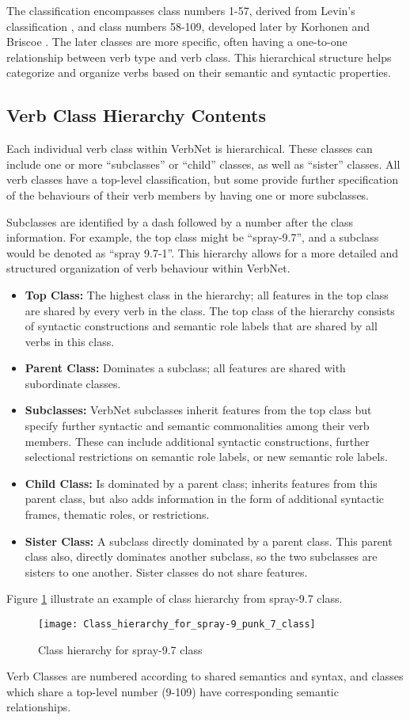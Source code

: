 The classification encompasses class numbers 1-57, derived from Levin's classification \cite{levin1993english}, and class numbers 58-109, developed later by Korhonen and Briscoe \cite{korhonen2004extended}. The later classes are more specific, often having a one-to-one relationship between verb type and verb class. This hierarchical structure helps categorize and organize verbs based on their semantic and syntactic properties.
\subsection*{Verb Class Hierarchy Contents}
Each individual verb class within VerbNet is hierarchical. These classes can include one or more \enquote{subclasses} or \enquote{child} classes, as well as \enquote{sister} classes. All verb classes have a top-level classification, but some provide further specification of the behaviours of their verb members by having one or more subclasses. 

Subclasses are identified by a dash followed by a number after the class information. For example, the top class might be \enquote{spray-9.7}, and a subclass would be denoted as \enquote{spray 9.7-1}. This hierarchy allows for a more detailed and structured organization of verb behaviour within VerbNet. 
\begin{itemize}
\item \textbf{Top Class:} The highest class in the hierarchy; all features in the top class are shared by every verb in the class. The top class of the hierarchy consists of syntactic constructions and semantic role labels that are shared by all verbs in this class.
\item \textbf{Parent Class:} Dominates a subclass; all features are shared with subordinate classes.
\item \textbf{Subclasses:} VerbNet subclasses inherit features from the top class but specify further syntactic and semantic commonalities among their verb members. These can include additional syntactic constructions, further selectional restrictions on semantic role labels, or new semantic role labels.
\item \textbf{Child Class:} Is dominated by a parent class; inherits features from this parent class, but also adds information in the form of additional syntactic frames, thematic roles, or restrictions. 
\item \textbf{Sister Class:} A subclass directly dominated by a parent class. This parent class also, directly dominates another subclass, so the two subclasses are sisters to one another. Sister classes do not share features.
\end{itemize}
Figure \ref{fig:hierachy_class} illustrate an example of class hierarchy from spray-9.7 class.
\begin{figure}
\center
\texttt{[image: Class\_hierarchy\_for\_spray-9\_punk\_7\_class]}
\caption{Class hierarchy for spray-9.7 class \cite{heck2014quality}}\label{fig:hierachy_class}
\end{figure}
Verb Classes are numbered according to shared semantics and syntax, and classes which share a top-level number (9-109) have corresponding semantic relationships. 

